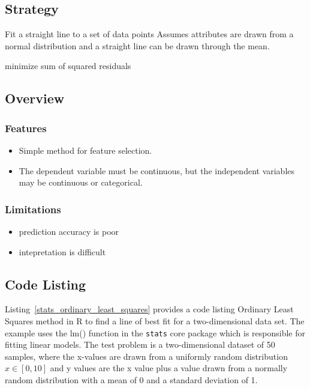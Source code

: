 \subsection{Strategy}

Fit a straight line to a set of data points
Assumes attributes are drawn from a normal distribution and a straight line can be drawn through the mean.

minimize sum of squared residuals


\subsection{Overview}

\subsubsection{Features}

\begin{itemize}
	\item Simple method for feature selection.
	\item The dependent variable must be continuous, but the independent variables may be continuous or categorical.
\end{itemize}

\subsubsection{Limitations}

\begin{itemize}
	\item prediction accuracy is poor
	\item intepretation is difficult
\end{itemize}

\subsection{Code Listing}
Listing~\ref{stats_ordinary_least_squares} provides a code listing Ordinary Least Squares method in R to find a line of best fit for a two-dimensional data set.
The example uses the {lm()} function in the \texttt{stats} core package which is responsible for fitting linear models.
The test problem is a two-dimensional dataset of 50 samples, where the x-values are drawn from a uniformly random distribution $x \in [0,10]$ and y values are the x value plus a value drawn from a normally random distribution with a mean of 0 and a standard deviation of 1.


